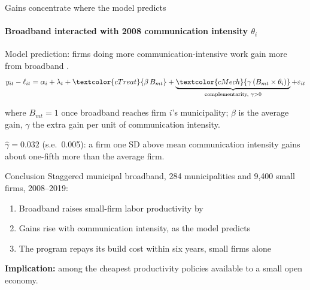 \documentclass[11pt, aspectratio=169]{beamer}
\begin{document}
\begin{frame}[t]{Gains concentrate where the model predicts}
  \framesubtitle{Broadband interacted with 2008 communication intensity $\theta_i$}
  \medskip
  Model prediction: firms doing more communication-intensive work gain more from
  broadband .
  \medskip
  \[
    y_{it}-\ell_{it} = \alpha_i + \lambda_t
      + \textcolor{cTreat}{\beta\,B_{mt}}
      + \underbrace{\textcolor{cMech}{\gamma\,(B_{mt}\times\theta_i)}}_{\text{complementarity, }\gamma>0}
      + \varepsilon_{it}
  \]
  {\small where $B_{mt}=1$ once broadband reaches firm $i$'s municipality;
  \textcolor{cTreat}{$\beta$} is the average gain, \textcolor{cMech}{$\gamma$}
  the extra gain per unit of communication intensity.\par}
  \medskip
  \begin{ResultBox}
    \textcolor{cMech}{$\hat\gamma=0.032$} (s.e.\ 0.005): a firm one SD above mean
    communication intensity gains about one-fifth more than the average firm.  %
  \end{ResultBox}
  \hypertarget{main:mech}{}%
\end{frame}

\begin{frame}[t]{Conclusion}
  \medskip
  Staggered municipal broadband, 284 municipalities and 9{,}400 small firms, 2008--2019:
  \medskip
  \begin{enumerate}\setlength{\itemsep}{0.9em}
    \item Broadband raises small-firm labor productivity by    %
    \item Gains rise with communication intensity, as the model predicts   %
    \item The program repays its build cost within six years, small firms alone  %
  \end{enumerate}
  \medskip
  \textbf{Implication:} among the cheapest productivity policies available to a small open economy.
  \hypertarget{main:concl}{}%
\end{frame}
\end{document}
